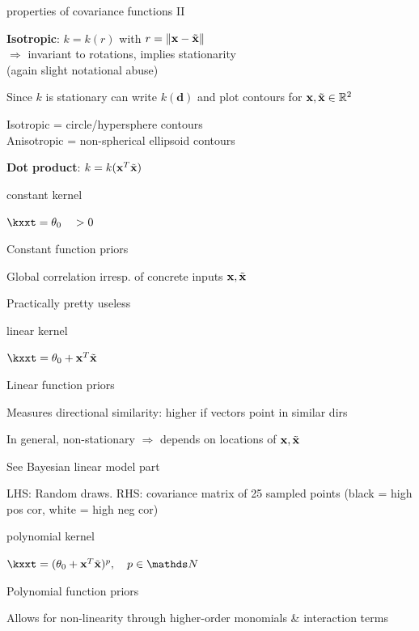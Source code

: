 \documentclass[11pt,compress,t,notes=noshow, xcolor=table]{beamer}
\begin{document}
\begin{framei}[sep=L]{properties of covariance functions II}
\item \textbf{Isotropic}: $k = k(r)$ with $r = \| \mathbf{x} - \tilde{\mathbf{x}}\|$ \\
$\Rightarrow$ invariant to rotations, implies stationarity\\
(again slight notational abuse)
\item Since $k$ is stationary can write $k(\bm{d})$ and plot contours for $\mathbf{x}, \tilde{\mathbf{x}} \in \mathbb{R}^2$
\item Isotropic = circle/hypersphere contours\\
Anisotropic = non-spherical ellipsoid contours
\item \textbf{Dot product}: $k = k(\mathbf{x}^T \tilde{\mathbf{x}})$
\end{framei}

\begin{framei}{constant kernel}
\item $\kxxt = \theta_0 \quad > 0$
\item Constant function priors
\item Global correlation irresp. of concrete inputs $\mathbf{x}, \tilde{\mathbf{x}}$
\item Practically pretty useless
\vfill
{}
\end{framei}

\begin{framei}{linear kernel}
\item $\kxxt = \theta_0 + \xv^T \xtil$
\item Linear function priors
\item Measures directional similarity: higher if vectors point in similar dirs
\item In general, non-stationary $\Rightarrow$ depends on locations of $\mathbf{x}, \tilde{\mathbf{x}}$
\item See Bayesian linear model part
\item LHS: Random draws. RHS: covariance matrix of 25 sampled points (black = high pos cor, white = high neg cor)
\vfill
{}
\end{framei}

\begin{framei}{polynomial kernel}
\item $\kxxt = (\theta_0 + \xv^T \xtil )^p, \quad p \in \N$
\item Polynomial function priors
\item Allows for non-linearity through higher-order monomials \& interaction terms
\vfill
{}
\end{framei}
\end{document}
